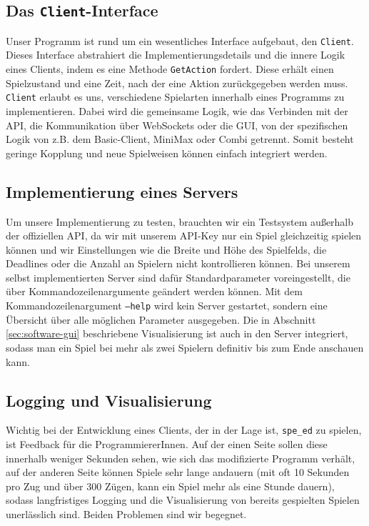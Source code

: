 \documentclass[12pt,a4paper]{article}
\begin{document}
\subsection{Das \texttt{Client}-Interface}
Unser Programm ist rund um ein wesentliches Interface aufgebaut, den \texttt{Client}.
Dieses Interface abstrahiert die Implementierungsdetails und die innere Logik eines Clients, indem es eine Methode \texttt{GetAction} fordert.
Diese erhält einen Spielzustand und eine Zeit, nach der eine Aktion zurückgegeben werden muss.
\texttt{Client} erlaubt es uns, verschiedene Spielarten innerhalb eines Programms zu implementieren.
Dabei wird die gemeinsame Logik, wie das Verbinden mit der API, die Kommunikation über WebSockets oder die GUI, von der spezifischen Logik von z.B. dem Basic-Client, MiniMax oder Combi getrennt. Somit besteht geringe Kopplung und neue Spielweisen können einfach integriert werden.

\subsection{Implementierung eines Servers} \label{sec:software-server}
Um unsere Implementierung zu testen, brauchten wir ein Testsystem außerhalb der offiziellen API, da wir mit unserem API-Key nur ein Spiel gleichzeitig spielen können und wir Einstellungen wie die Breite und Höhe des Spielfelds, die Deadlines oder die Anzahl an Spielern nicht kontrollieren können. Bei unserem selbst implementierten Server sind dafür Standardparameter voreingestellt, die über Kommandozeilenargumente geändert werden können. Mit dem Kommandozeilenargument \texttt{--help} wird kein Server gestartet, sondern eine Übersicht über alle möglichen Parameter ausgegeben. Die in Abschnitt \ref{sec:software-gui} beschriebene Visualisierung ist auch in den Server integriert, sodass man ein Spiel bei mehr als zwei Spielern definitiv bis zum Ende anschauen kann.

\subsection{Logging und Visualisierung}
Wichtig bei der Entwicklung eines Clients, der in der Lage ist, \texttt{spe\_ed} zu spielen, ist Feedback für die ProgrammiererInnen.
Auf der einen Seite sollen diese innerhalb weniger Sekunden sehen, wie sich das modifizierte Programm verhält, auf der anderen Seite können Spiele sehr lange andauern (mit oft 10 Sekunden pro Zug und über 300 Zügen, kann ein Spiel mehr als eine Stunde dauern), sodass langfristiges Logging und die Visualisierung von bereits gespielten Spielen unerlässlich sind.
Beiden Problemen sind wir begegnet.
\end{document}

